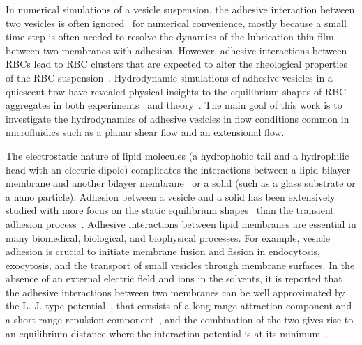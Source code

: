 \documentclass[prf,superscriptaddress,showkeys]{revtex4-1}
\begin{document}
In numerical simulations of a vesicle suspension, the adhesive
interaction between two vesicles is often
ignored~\cite{Veerapaneni2009_JCP,  RahimianVeerapaneniBiros2010_JCP}
for numerical convenience, mostly because a small time step is often
needed to resolve the dynamics of the lubrication thin film between two
membranes with adhesion.  However, adhesive interactions between RBCs
lead to RBC clusters that are expected to alter the
rheological properties of the RBC suspension~\cite{NeuMeiselman2002_BJ,
SvetinaZiherl2008_Bioelectrochemistry}. Hydrodynamic simulations of
adhesive vesicles in a quiescent flow have revealed physical insights to
the equilibrium shapes of RBC aggregates in both
experiments~\cite{FlormannAouane2017_SciReports} and
theory~\cite{ZiherlSvetina2007_PNAS}. The main goal of this work is to
investigate the hydrodynamics of adhesive vesicles in flow conditions
common in microfluidics such as a planar shear flow and an
extensional flow.

The electrostatic nature of lipid molecules (a hydrophobic tail and a
hydrophilic head with an electric dipole) complicates the interactions
between a lipid bilayer membrane and another bilayer
membrane~\cite{EvansMetcalfe1984_BJ, Book_PhysicalBasisCellAdhesion,
Book_IntermolecularSurfaceForces, PerutkovaFrank-Bertoncelij2013_CSB} or
a solid (such as a glass substrate or a nano particle).  Adhesion
between a vesicle and a solid has been extensively studied with more
focus on the static equilibrium shapes~\cite{Seifert1990_PRA,
ShiFengGao2006_ActaMechSin, LinFreund2007_IntJSolidsStructures,
GruhnFrankeDimova2007_Langmuir,das2008adhesion,
zhang2009phase,Agudo-Canalejo2015_ACSNano,Agudo-CanalejoLipowsky2015_NanoLett,
SteinkuhlerAgudo-Canalejo2016_BJ,Agudo-CanalejoLipowsky2017_SoftMatt}
than the transient adhesion process~\cite{cantat1999lift, suk-sei2001,
BlountMiksisDavis2013_PRSa}.  Adhesive interactions between lipid
membranes are essential in many biomedical, biological, and biophysical
processes.  For example, vesicle adhesion is crucial to initiate
membrane fusion and fission in endocytosis, exocytosis, and the
transport of small vesicles through membrane surfaces.  In the absence
of an external electric field and ions in the solvents, it is reported
that the adhesive interactions between two membranes can be well
approximated by the L.-J.-type
potential~\cite{FlormannAouane2017_SciReports}, that consists of a
long-range attraction component and a short-range repulsion
component~\cite{Book_IntermolecularSurfaceForces}, and the combination
of the two gives rise to an equilibrium distance where the interaction
potential is at its minimum~\cite{Book_IntermolecularSurfaceForces}. 
\end{document}
